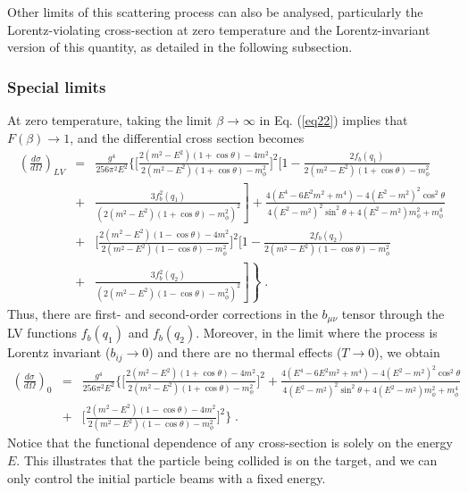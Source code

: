 \documentclass[11pt,showpacs,preprintnumbers,amsmath,amssymb,prd,nofootinbib,superscriptaddress]{revtex4-2}
\begin{document}
Other limits of this scattering process can also be analysed, particularly the Lorentz-violating cross-section at zero temperature and the Lorentz-invariant version of this quantity, as detailed in the following subsection.

\subsubsection{Special limits}

At zero temperature, taking the limit $\beta \to \infty$ in Eq. (\ref{eq22}) implies that $F(\beta) \to 1$, and the differential cross section  becomes
 {\color{red} \begin{eqnarray}
\left(\frac{d\sigma}{d\Omega}\right)_{LV}&=&\frac{g^4}{256\pi^2 E^2}\biggl\{\biggl[\frac{2(m^2-E^2)(1+\cos{\theta})-4m^2}{2(m^2-E^2)(1+\cos{\theta})-m_\phi^2}\biggr]^2\biggl[1-\frac{2f_b(q_1)}{2(m^2-E^2)(1+\cos{\theta})-m_\phi^2}\nonumber\\&+&\left.\frac{3f_b^2(q_1)}{\left(2(m^2-E^2)(1+\cos{\theta})-m_\phi^2\right)^2}\right]+\frac{4(E^4-6E^2m^2+m^4)-4(E^2-m^2)^2\cos^2{\theta}}{4(E^2-m^2)^2\sin^2{\theta}+4(E^2-m^2)m_\phi^2+m_\phi^4}\nonumber\\&+&\biggl[\frac{2(m^2-E^2)(1-\cos{\theta})-4m^2}{2(m^2-E^2)(1-\cos{\theta})-m_\phi^2}\biggr]^2\biggl[1-\frac{2f_b(q_2)}{2(m^2-E^2)(1-\cos{\theta})-m_\phi^2}\nonumber\\ &+&\left.\left.\frac{3f_b^2(q_2)}{\left(2(m^2-E^2)(1-\cos{\theta})-m_\phi^2\right)^2}\right]\right\}\;.\end{eqnarray}}
Thus, there are first- and second-order corrections in the $b_{\mu \nu}$ tensor through the LV functions $f_b(q_1)$ and $f_b(q_2)$. Moreover, in the limit where the process is Lorentz invariant ($b_{ij} \to 0$) and there are no thermal effects ($T \to 0$), we obtain
\begin{eqnarray}
   \left(\frac{d\sigma}{d\Omega}\right)_{0}&=&\frac{g^4}{256\pi^2 E^2}\biggl\{\biggl[\frac{2(m^2-E^2)(1+\cos{\theta})-4m^2}{2(m^2-E^2)(1+\cos{\theta})-m_\phi^2}\biggr]^2+\frac{4(E^4-6E^2m^2+m^4)-4(E^2-m^2)^2\cos^2{\theta}}{4(E^2-m^2)^2\sin^2{\theta}+4(E^2-m^2)m_\phi^2+m_\phi^4}\nonumber\\&+&\biggl[\frac{2(m^2-E^2)(1-\cos{\theta})-4m^2}{2(m^2-E^2)(1-\cos{\theta})-m_\phi^2}\biggr]^2\biggr\}\;.
\end{eqnarray}
Notice that the functional dependence of any cross-section is solely on the energy $E$. This illustrates that the particle being collided is on the target, and we can only control the initial particle beams with a fixed energy.
\end{document}
